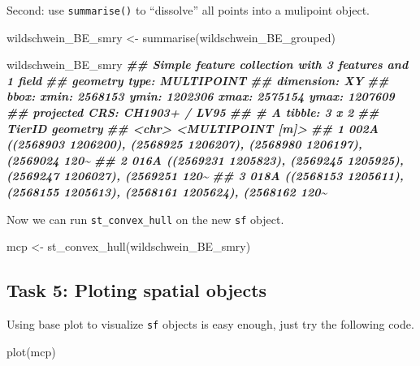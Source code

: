 \documentclass[
]{book}
\newenvironment{Shaded}{\begin{snugshade}}{\end{snugshade}}
\newcommand{\DocumentationTok}[1]{\textcolor[rgb]{0.56,0.35,0.01}{\textbf{\textit{#1}}}}
\newcommand{\FunctionTok}[1]{\textcolor[rgb]{0.00,0.00,0.00}{#1}}
\newcommand{\NormalTok}[1]{#1}
\newcommand{\OtherTok}[1]{\textcolor[rgb]{0.56,0.35,0.01}{#1}}
\begin{document}
Second: use \texttt{summarise()} to ``dissolve'' all points into a mulipoint object.

\begin{Shaded}
\begin{Highlighting}[]
\NormalTok{wildschwein\_BE\_smry }\OtherTok{\textless{}{-}} \FunctionTok{summarise}\NormalTok{(wildschwein\_BE\_grouped)}

\NormalTok{wildschwein\_BE\_smry}
\DocumentationTok{\#\# Simple feature collection with 3 features and 1 field}
\DocumentationTok{\#\# geometry type:  MULTIPOINT}
\DocumentationTok{\#\# dimension:      XY}
\DocumentationTok{\#\# bbox:           xmin: 2568153 ymin: 1202306 xmax: 2575154 ymax: 1207609}
\DocumentationTok{\#\# projected CRS:  CH1903+ / LV95}
\DocumentationTok{\#\# \# A tibble: 3 x 2}
\DocumentationTok{\#\#   TierID                                                                geometry}
\DocumentationTok{\#\#   \textless{}chr\textgreater{}                                                         \textless{}MULTIPOINT [m]\textgreater{}}
\DocumentationTok{\#\# 1 002A   ((2568903 1206200), (2568925 1206207), (2568980 1206197), (2569024 120\textasciitilde{}}
\DocumentationTok{\#\# 2 016A   ((2569231 1205823), (2569245 1205925), (2569247 1206027), (2569251 120\textasciitilde{}}
\DocumentationTok{\#\# 3 018A   ((2568153 1205611), (2568155 1205613), (2568161 1205624), (2568162 120\textasciitilde{}}
\end{Highlighting}
\end{Shaded}

Now we can run \texttt{st\_convex\_hull} on the new \texttt{sf} object.

\begin{Shaded}
\begin{Highlighting}[]
\NormalTok{mcp }\OtherTok{\textless{}{-}} \FunctionTok{st\_convex\_hull}\NormalTok{(wildschwein\_BE\_smry)}
\end{Highlighting}
\end{Shaded}

\hypertarget{task-5-ploting-spatial-objects}{%
\subsection{Task 5: Ploting spatial objects}\label{task-5-ploting-spatial-objects}}

Using base plot to visualize \texttt{sf} objects is easy enough, just try the following code.

\begin{Shaded}
\begin{Highlighting}[]
\FunctionTok{plot}\NormalTok{(mcp)}
\end{Highlighting}
\end{Shaded}
\end{document}

